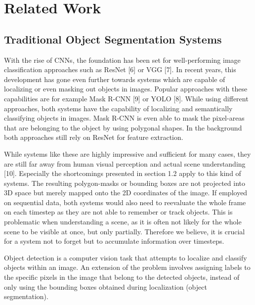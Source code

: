 \chapter{Related Work}\label{chap:background}


\section{Traditional Object Segmentation Systems}\label{chap:2:segment}

With the rise of CNNs, the foundation has been set for well-performing image classiﬁcation approaches such as ResNet [6] or VGG [7]. In recent years, this development has gone even further towards systems which are capable of localizing or even masking out objects in images. Popular approaches with these capabilities are for example Mask R-CNN [9] or YOLO [8]. While using diﬀerent approaches, both systems have the capability of localizing and semantically classifying objects in images. Mask R-CNN is even able to mask the pixel-areas that are belonging to the object by using polygonal shapes. In the background both approaches still rely on ResNet for feature extraction.

While systems like these are highly impressive and suﬃcient for many cases, they are still far away from human visual perception and actual scene understanding [10]. Especially the shortcomings presented in section 1.2 apply to this kind of systems. The resulting polygon-masks or bounding boxes are not projected into 3D space but merely mapped onto the 2D coordinates of the image. If employed on sequential data, both systems would also need to reevaluate the whole frame on each timestep as they are not able to remember or track objects. This is problematic when understanding a scene, as it is often not likely for the whole scene to be visible at once, but only partially. Therefore we believe, it is crucial for a system not to forget but to accumulate information over timesteps.

Object detection is a computer vision task that attempts to localize and classify objects within an image. An extension of the problem involves assigning labels to the specific pixels in the image that belong to the detected objects, instead of only using the bounding boxes obtained during localization (object segmentation). 

